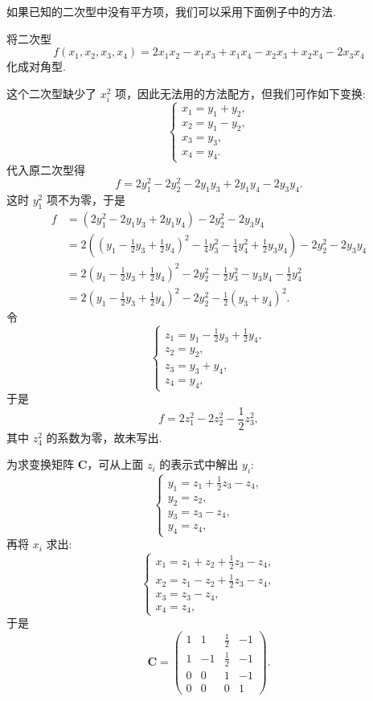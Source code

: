 \documentclass[../../main.tex]{subfiles}%
\begin{document}
如果已知的二次型中没有平方项，我们可以采用下面例子中的方法.
\begin{example}
将二次型
\[
f(x_1,x_2,x_3,x_4)=2x_1x_2 - x_1x_3 + x_1x_4 - x_2x_3 + x_2x_4 - 2x_3x_4
\]
化成对角型.
\end{example}
\begin{solution}
这个二次型缺少了 $x_i^2$ 项，因此无法用的方法配方，但我们可作如下变换:
\[
\begin{cases}
x_1 = y_1 + y_2,\\
x_2 = y_1 - y_2,\\
x_3 = y_3,\\
x_4 = y_4.
\end{cases}
\]
代入原二次型得
\[
f = 2y_1^2 - 2y_2^2 - 2y_1y_3 + 2y_1y_4 - 2y_3y_4.
\]
这时 $y_1^2$ 项不为零，于是
\begin{align*}
f&=(2y_1^2 - 2y_1y_3 + 2y_1y_4) - 2y_2^2 - 2y_3y_4\\
&=2\left((y_1 - \frac{1}{2}y_3 + \frac{1}{2}y_4)^2 - \frac{1}{4}y_3^2 - \frac{1}{4}y_4^2 + \frac{1}{2}y_3y_4\right) - 2y_2^2 - 2y_3y_4\\
&=2(y_1 - \frac{1}{2}y_3 + \frac{1}{2}y_4)^2 - 2y_2^2 - \frac{1}{2}y_3^2 - y_3y_4 - \frac{1}{2}y_4^2\\
&=2(y_1 - \frac{1}{2}y_3 + \frac{1}{2}y_4)^2 - 2y_2^2 - \frac{1}{2}(y_3 + y_4)^2.
\end{align*}
令
\[
\begin{cases}
z_1 = y_1 - \frac{1}{2}y_3 + \frac{1}{2}y_4,\\
z_2 = y_2,\\
z_3 = y_3 + y_4,\\
z_4 = y_4,
\end{cases}
\]
于是
\[
f = 2z_1^2 - 2z_2^2 - \frac{1}{2}z_3^2,
\]
其中 $z_4^2$ 的系数为零，故未写出.

为求变换矩阵 $\boldsymbol{C}$，可从上面 $z_i$ 的表示式中解出 $y_i$:
\[
\begin{cases}
y_1 = z_1 + \frac{1}{2}z_3 - z_4,\\
y_2 = z_2,\\
y_3 = z_3 - z_4,\\
y_4 = z_4,
\end{cases}
\]
再将 $x_i$ 求出:
\[
\begin{cases}
x_1 = z_1 + z_2 + \frac{1}{2}z_3 - z_4,\\
x_2 = z_1 - z_2 + \frac{1}{2}z_3 - z_4,\\
x_3 = z_3 - z_4,\\
x_4 = z_4,
\end{cases}
\]
于是
\[
\boldsymbol{C}=
\begin{pmatrix}
1 & 1 & \frac{1}{2} & -1\\
1 & -1 & \frac{1}{2} & -1\\
0 & 0 & 1 & -1\\
0 & 0 & 0 & 1
\end{pmatrix}.
\] 

\end{solution}
\end{document}
